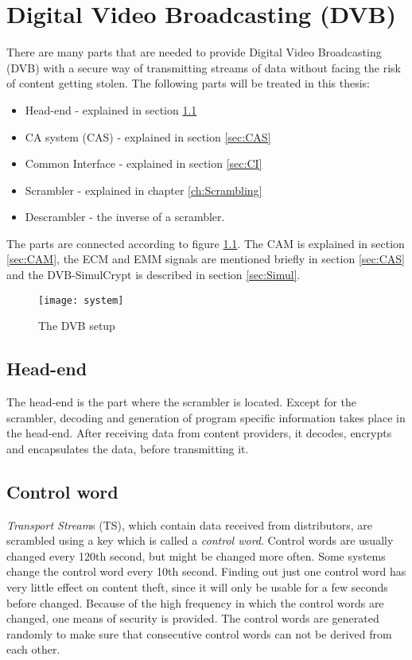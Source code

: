 \chapter{Digital Video Broadcasting (DVB)}\label{ch:DVB}
There are many parts that are needed to provide Digital Video 
Broadcasting (DVB) with a secure way of transmitting streams of data 
without facing the risk of content getting stolen. The following parts 
will be treated in this thesis:

\begin{itemize}
\item Head-end - explained in section \ref{sec:HE}
\item CA system (CAS) - explained in section \ref{sec:CAS}
\item Common Interface - explained in section \ref{sec:CI}
\item Scrambler - explained in chapter \ref{ch:Scrambling}
\item Descrambler - the inverse of a scrambler.
\end{itemize}

The parts are connected according to figure \ref{fig:system}. The CAM is
explained in section \ref{sec:CAM}, the ECM and EMM signals are 
mentioned briefly in section \ref{sec:CAS} and the DVB-SimulCrypt is 
described in section \ref{sec:Simul}.

\begin{figure}[h!]
  \texttt{[image: system]}
  \caption{The DVB setup}
  \label{fig:system}
\end{figure}

\section{Head-end} \label{sec:HE}
The head-end is the part where the scrambler is located. Except for the 
scrambler, decoding and generation of program specific information takes
place in the head-end. After receiving data from content providers, it 
decodes, encrypts and encapsulates the data, before transmitting it.

\section{Control word} \label{sec:setup}
\emph{Transport Stream}s (TS), which contain data received from 
distributors, are scrambled using a key which is called a \emph{control 
word}. Control words are usually changed every 120th second, but might 
be changed more often. Some systems change the control word every 10th 
second. Finding out just one control word has very little effect on 
content theft, since it will only be usable for a few seconds before 
changed. Because of the high frequency in which the control words are 
changed, one means of security is provided. The control words are 
generated randomly to make sure that consecutive control words can not 
be derived from each other.

